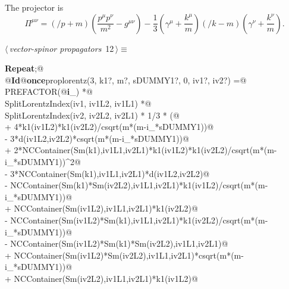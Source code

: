 \documentclass[a4paper,12pt]{amsart}
\newcommand{\fmslash}[1]{\ensuremath{/\!\!\!{#1}}}
\renewcommand{\NWtarget}[2]{\hypertarget{#1}{#2}}
\begin{document}
The projector is
\begin{equation}
\Pi^{\mu\nu}=\left(\fmslash{p}+m\right)
\left(\frac{p^\mu p^\nu}{m^2}-g^{\mu\nu}\right)-\frac13
\left(\gamma^\mu+\frac{k^\mu}{m}\right)
\left(\fmslash{k}-m\right)
\left(\gamma^\nu+\frac{k^\nu}{m}\right)\text{.}
\end{equation}
\begin{flushleft} \small
\begin{minipage}{\linewidth}\label{scrap31}\raggedright\small
\NWtarget{nuweb12}{} $\langle\,${\itshape vector-spinor propagators}\nobreak\ {\footnotesize {12}}$\,\rangle\equiv$
\vspace{-1ex}
\begin{list}{}{} \item
\mbox{}\verb@@\hbox{\sffamily\bfseries Repeat}\verb@;@\\
\mbox{}\verb@   @\hbox{\sffamily\bfseries Id}\verb@ @\hbox{\sffamily\bfseries once}\verb@ proplorentz(3, k1?, m?, sDUMMY1?, 0, iv1?, iv2?) =@\\
\mbox{}\verb@      PREFACTOR(@\hbox{\sffamily\bfseries i}\verb@_) *@\\
\mbox{}\verb@      SplitLorentzIndex(iv1, iv1L2, iv1L1) *@\\
\mbox{}\verb@      SplitLorentzIndex(iv2, iv2L2, iv2L1) * 1/3 * (@\\
\mbox{}\verb@         + 4*k1(iv1L2)*k1(iv2L2)/csqrt(m*(m-i_*sDUMMY1))@\\
\mbox{}\verb@         - 3*d(iv1L2,iv2L2)*csqrt(m*(m-i_*sDUMMY1))@\\
\mbox{}\verb@         + 2*NCContainer(Sm(k1),iv1L1,iv2L1)*k1(iv1L2)*k1(iv2L2)/csqrt(m*(m-i_*sDUMMY1))^2@\\
\mbox{}\verb@         - 3*NCContainer(Sm(k1),iv1L1,iv2L1)*d(iv1L2,iv2L2)@\\
\mbox{}\verb@         - NCContainer(Sm(k1)*Sm(iv2L2),iv1L1,iv2L1)*k1(iv1L2)/csqrt(m*(m-i_*sDUMMY1))@\\
\mbox{}\verb@         + NCContainer(Sm(iv1L2),iv1L1,iv2L1)*k1(iv2L2)@\\
\mbox{}\verb@         - NCContainer(Sm(iv1L2)*Sm(k1),iv1L1,iv2L1)*k1(iv2L2)/csqrt(m*(m-i_*sDUMMY1))@\\
\mbox{}\verb@         - NCContainer(Sm(iv1L2)*Sm(k1)*Sm(iv2L2),iv1L1,iv2L1)@\\
\mbox{}\verb@         + NCContainer(Sm(iv1L2)*Sm(iv2L2),iv1L1,iv2L1)*csqrt(m*(m-i_*sDUMMY1))@\\
\mbox{}\verb@         + NCContainer(Sm(iv2L2),iv1L1,iv2L1)*k1(iv1L2)@\\

\end{list}
\end{minipage}
\end{flushleft}
\end{document}
